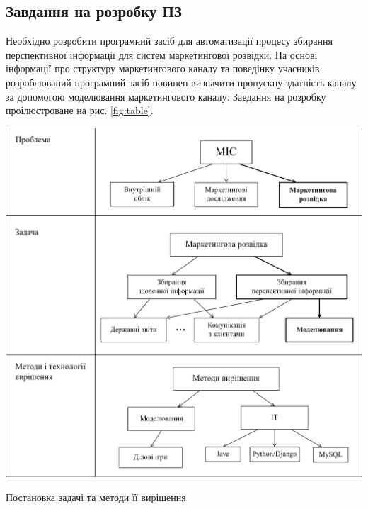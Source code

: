 \subsection{Завдання на розробку ПЗ}
Необхідно розробити програмний засіб для автоматизації процесу збирання перспективної інформації для систем маркетингової розвідки. На основі інформації про структуру маркетингового каналу та поведінку учасників розроблюваний програмний засіб повинен визначити пропускну здатність каналу за допомогою моделювання маркетингового каналу. Завдання на розробку проілюстроване на рис. \ref{fig:table}.
            \begin{stdfigure}
                \includegraphics[width=7in]{images/table.png}
                \caption{Постановка задачі та методи її вирішення}
                \label{fig:table}
            \end{stdfigure}
